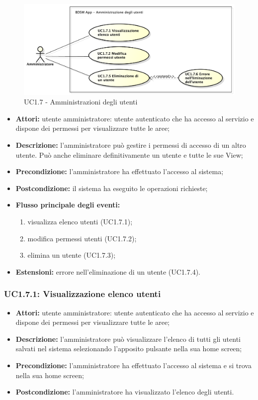 \begin{figure}[!htbp]
    \centering
    \centerline{\includegraphics[scale=0.45]{./images/UC1_7.pdf}}
    \caption{UC1.7 - Amministrazioni degli utenti}
\end{figure}

\begin{itemize}
    \item \textbf{Attori:} utente amministratore: utente autenticato che ha accesso al servizio e dispone dei permessi per visualizzare tutte le aree;
    \item \textbf{Descrizione:} l'amministratore può gestire i permessi di accesso di un altro utente. Può anche eliminare definitivamente un utente e tutte le sue View;
    \item \textbf{Precondizione:} l'amministratore ha effettuato l'accesso al sistema;
    \item \textbf{Postcondizione:} il sistema ha eseguito le operazioni richieste;
    \item \textbf{Flusso principale degli eventi:}
    \begin{enumerate}
        \item visualizza elenco utenti (UC1.7.1);
        \item modifica permessi utenti (UC1.7.2);
        \item elimina un utente (UC1.7.3);
    \end{enumerate}
    \item \textbf{Estensioni:} errore nell'eliminazione di un utente (UC1.7.4).
\end{itemize}

\subsubsection{UC1.7.1: Visualizzazione elenco utenti}

\begin{itemize}
    \item \textbf{Attori:} utente amministratore: utente autenticato che ha accesso al servizio e dispone dei permessi per visualizzare tutte le aree;
    \item \textbf{Descrizione:} l'amministratore può visualizzare l'elenco di tutti gli utenti salvati nel sistema selezionando l'apposito pulsante nella sua home screen;
    \item \textbf{Precondizione:} l'amministratore ha effettuato l'accesso al sistema e si trova nella sua home screen;
    \item \textbf{Postcondizione:} l'amministratore ha visualizzato l'elenco degli utenti.
\end{itemize}


